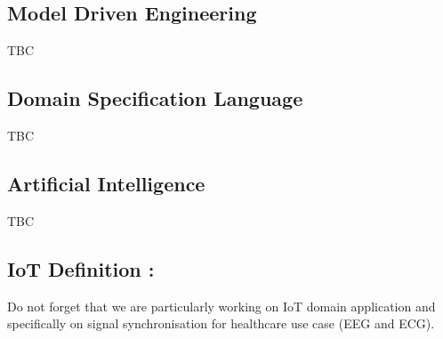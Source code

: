 
\subsection{Model Driven Engineering}
TBC

\subsection{Domain Specification Language}
TBC

\subsection{Artificial Intelligence} 
TBC

\subsection{IoT Definition : }
Do not forget that we are particularly working on IoT domain application and specifically on signal synchronisation for healthcare use case (EEG and ECG).
